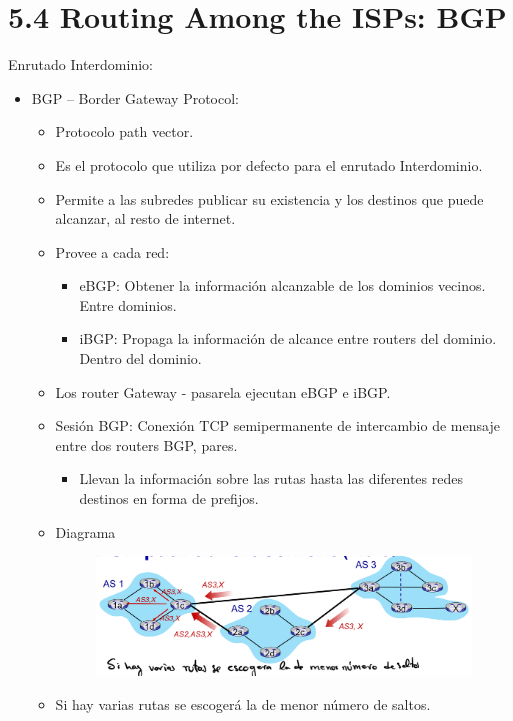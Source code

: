 \documentclass[12pt, twoside, openright]{report} %
\begin{document}
\pagebreak
\section{5.4 Routing Among the ISPs: BGP}

    Enrutado Interdominio:

    \begin{itemize}
    \item
      BGP -- Border Gateway Protocol:

      \begin{itemize}
      \item
        Protocolo path vector.
      \item
        Es el protocolo que utiliza por defecto para el enrutado
        Interdominio.
      \item
        Permite a las subredes publicar su existencia y los destinos que
        puede alcanzar, al resto de internet.
      \item
        Provee a cada red:

        \begin{itemize}
        \item
          eBGP: Obtener la información alcanzable de los dominios
          vecinos. Entre dominios.
        \item
          iBGP: Propaga la información de alcance entre routers del
          dominio. Dentro del dominio.
        \end{itemize}
      \item
        Los router Gateway - pasarela ejecutan eBGP e iBGP.
      \item
        Sesión BGP: Conexión TCP semipermanente de intercambio de
        mensaje entre dos routers BGP, pares.

        \begin{itemize}
        \item
          Llevan la información sobre las rutas hasta las diferentes
          redes destinos en forma de prefijos.
        \end{itemize}
		\item
    Diagrama
	\begin{figure}[H]
		{\includegraphics[scale=.15]{Untitled 45.png}}
	\end{figure}
    \item
      Si hay varias rutas se escogerá la de menor número de saltos.
      \end{itemize}
    \end{itemize}
  
\end{document}
